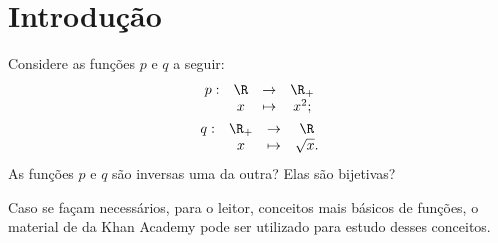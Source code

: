 \section{Introdução}

Considere as funções $p$ e $q$ a seguir:
%
\begin{gather*}
\begin{array}{cccc}
p : & \R & \to     & \R_+ \\
     &  x & \mapsto & x^2;
\end{array}\\
\begin{array}{cccc}
q : & \R_+ & \to     & \R \\
     &  x & \mapsto & \sqrt x.
\end{array}
\end{gather*}
As funções $p$ e $q$ são inversas uma da outra?  Elas são bijetivas?

\begin{remark}
Caso se façam necessários, para o leitor, conceitos mais básicos de funções, o material de  da Khan Academy pode ser utilizado para estudo desses conceitos.
\end{remark}